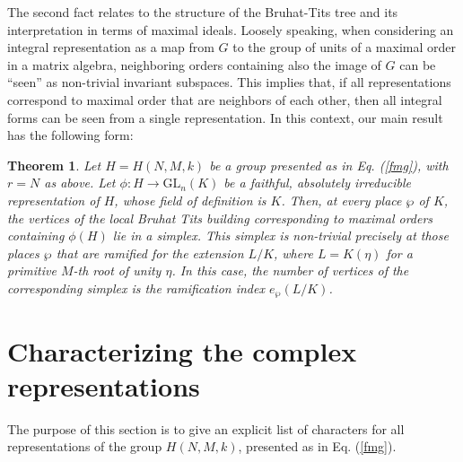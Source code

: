 \documentclass{article}
\newtheorem{theo}{Theorem}
\theoremstyle{definition}
\begin{document}
The second fact relates to the structure of the Bruhat-Tits tree and its
interpretation in terms of maximal ideals. Loosely speaking, when
considering an integral representation as a map from $G$ to the group
of units of a maximal order in a matrix algebra, neighboring orders
containing also the image of $G$ can be ``seen'' as non-trivial
invariant subspaces. This implies that, if all representations correspond
to maximal order that are neighbors of each other, then all integral forms
can be seen from a single representation. In this context, our main result has the following form:

\begin{theo}\label{t1}
    Let $H=H(N,M,k)$ be a group presented as in Eq. (\ref{fmg}), 
    with $r=N$ as above. Let 
    $\phi:H\rightarrow\mathrm{GL}_n(K)$ be a
    faithful, absolutely irreducible representation of $H$,
    whose field of definition is $K$. Then, at every place $\wp$ of $K$, 
    the vertices of the local Bruhat Tits building corresponding to maximal 
    orders containing $\phi(H)$ lie in a simplex.
    This simplex is non-trivial precisely at those places $\wp$
    that are ramified for the extension $L/K$, where $L=K(\eta)$ for
    a primitive $M$-th root of unity $\eta$. In this case,
    the number of vertices of the 
    corresponding simplex is the ramification index
    $e_\wp(L/K)$.
\end{theo}





\section{Characterizing the complex representations}

The purpose of this section is to give an explicit list
of characters for all representations of the group
$H(N,M,k)$, presented as in Eq. (\ref{fmg}). 
\end{document}
